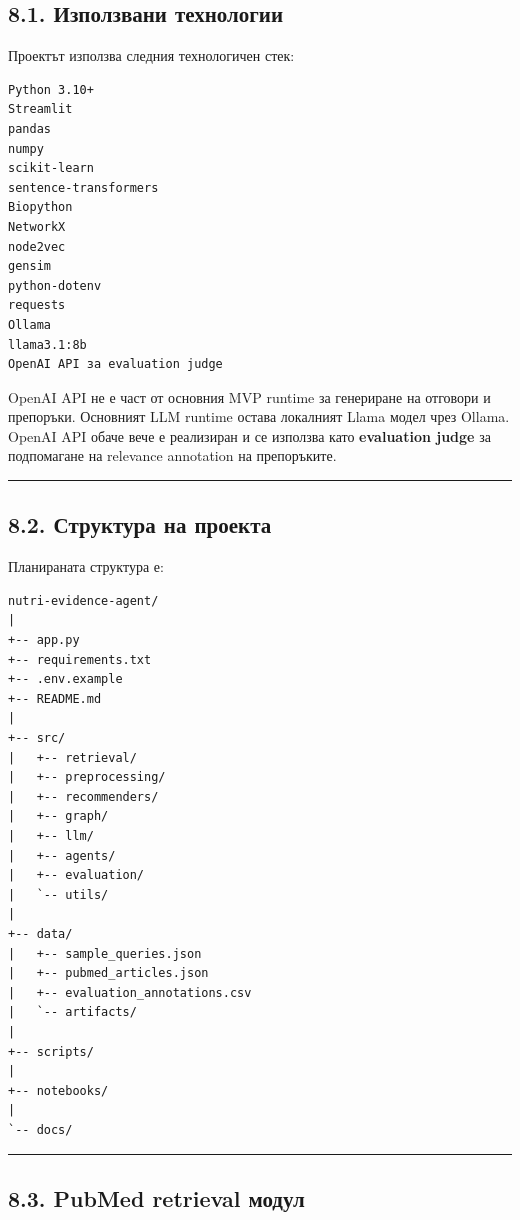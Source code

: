 \documentclass[12pt,a4paper]{article}
\begin{document}
\subsection{8.1. Използвани технологии}\label{ux438ux437ux43fux43eux43bux437ux432ux430ux43dux438-ux442ux435ux445ux43dux43eux43bux43eux433ux438ux438}

Проектът използва следния технологичен стек:

\begin{verbatim}
Python 3.10+
Streamlit
pandas
numpy
scikit-learn
sentence-transformers
Biopython
NetworkX
node2vec
gensim
python-dotenv
requests
Ollama
llama3.1:8b
OpenAI API за evaluation judge
\end{verbatim}

OpenAI API не е част от основния MVP runtime за генериране на отговори и препоръки. Основният LLM runtime остава локалният Llama модел чрез Ollama. OpenAI API обаче вече е реализиран и се използва като \textbf{evaluation judge} за подпомагане на relevance annotation на препоръките.

\vspace{0.5em}\hrule\vspace{1.0em}

\subsection{8.2. Структура на проекта}\label{ux441ux442ux440ux443ux43aux442ux443ux440ux430-ux43dux430-ux43fux440ux43eux435ux43aux442ux430}

Планираната структура е:

\begin{verbatim}
nutri-evidence-agent/
|
+-- app.py
+-- requirements.txt
+-- .env.example
+-- README.md
|
+-- src/
|   +-- retrieval/
|   +-- preprocessing/
|   +-- recommenders/
|   +-- graph/
|   +-- llm/
|   +-- agents/
|   +-- evaluation/
|   `-- utils/
|
+-- data/
|   +-- sample_queries.json
|   +-- pubmed_articles.json
|   +-- evaluation_annotations.csv
|   `-- artifacts/
|
+-- scripts/
|
+-- notebooks/
|
`-- docs/
\end{verbatim}

\vspace{0.5em}\hrule\vspace{1.0em}

\subsection{8.3. PubMed retrieval модул}\label{pubmed-retrieval-ux43cux43eux434ux443ux43b}
\end{document}
